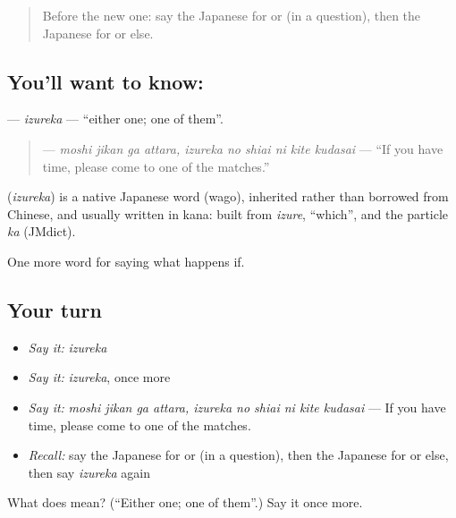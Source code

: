 \label{lesson:JA-C528-izureka}



\begin{quote}
Before the new one: say the Japanese for or (in a question), then the Japanese for or else.
\end{quote}

\subsection*{You'll want to know: }
\textbf{} — \emph{izureka} — \textquotedblleft{}either one; one of them\textquotedblright{}.

\begin{quote}
\textbf{     } — \emph{moshi jikan ga attara, izureka no shiai ni kite kudasai} — \textquotedblleft{}If you have time, please come to one of the matches.\textquotedblright{}
\end{quote}

\begin{cousinweb}
\textbf{} (\emph{izureka}) is a native Japanese word (wago), inherited rather than borrowed from Chinese, and usually written in kana: built from \emph{izure}, \textquotedblleft{}which\textquotedblright{}, and the particle \emph{ka} (JMdict).
\end{cousinweb}

\begin{grammarlens}[title={What you've built}]
One more word for saying what happens if.
\end{grammarlens}

\subsection*{Your turn}
\begin{itemize}
\raggedright
  \item \emph{Say it:} \emph{izureka}
  \item \emph{Say it:} \emph{izureka}, once more
  \item \emph{Say it:} \emph{moshi jikan ga attara, izureka no shiai ni kite kudasai} — If you have time, please come to one of the matches.
  \item \emph{Recall:} say the Japanese for or (in a question), then the Japanese for or else, then say \emph{izureka} again
\end{itemize}

\begin{tcolorbox}[breakable,colback=teal!4,colframe=teal!35!black,title={Before you move on}]
What does  mean? (\textquotedblleft{}Either one; one of them\textquotedblright{}.) Say it once more.
\end{tcolorbox}
